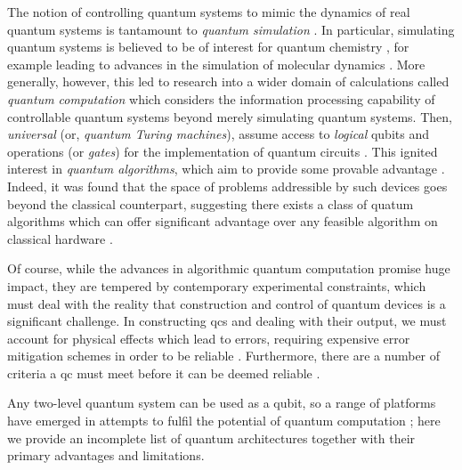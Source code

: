 \par 
The notion of controlling quantum systems to mimic the dynamics of real quantum systems is tantamount to 
    \emph{quantum simulation} \cite{lloyd1996universal, cirac2012goals}. 
In particular, simulating quantum systems is believed to be of interest for quantum chemistry \cite{cao2019quantum, lanyon2010towards, mcardle2020quantum}, 
    for example leading to advances in the simulation of molecular dynamics \cite{aspuru2005simulated, sparrow2018simulating}.
More generally, however, this led to research into a wider domain of calculations called \emph{quantum computation}
    which considers the information processing capability of controllable quantum systems beyond merely simulating quantum systems. 
Then, \emph{universal } (or, \emph{quantum Turing machines}), 
    assume access to \emph{logical} qubits and operations (or \emph{gates}) for the implementation of quantum circuits \cite{deutsch1985quantum}. 
This ignited interest in \emph{quantum algorithms}, which aim to provide some provable advantage 
    \cite{grover1997quantum, simon1997power, bennett1997strengths, bernstein1997quantum, shor1999polynomial}.
Indeed, it was found that the space of problems addressible by such devices
    goes beyond the classical counterpart,
    suggesting there exists a class of quatum algorithms which can offer significant advantage over 
    any feasible algorithm on classical hardware \cite{watrous2008quantum}. 
\par 

Of course, while the advances in algorithmic quantum computation promise huge impact, 
    they are tempered by contemporary experimental constraints, 
    which must deal with the reality that construction and control of 
    quantum devices is a significant challenge.
In constructing \glspl{qc} and dealing with their output, 
    we must account for physical effects which lead to errors, 
    requiring expensive error mitigation schemes in order to be reliable \cite{shor1996fault, aharonov2008fault}.
Furthermore, there are a number of criteria a \gls{qc} must meet before it can be deemed reliable \cite{divincenzo2000physical}. 
\par 

Any two-level quantum system can be used as a qubit, so a range of platforms have emerged in
    attempts to fulfil the potential of quantum computation \cite{humble2019quantum};
    here we provide an incomplete list of quantum architectures together with their primary advantages and limitations.

